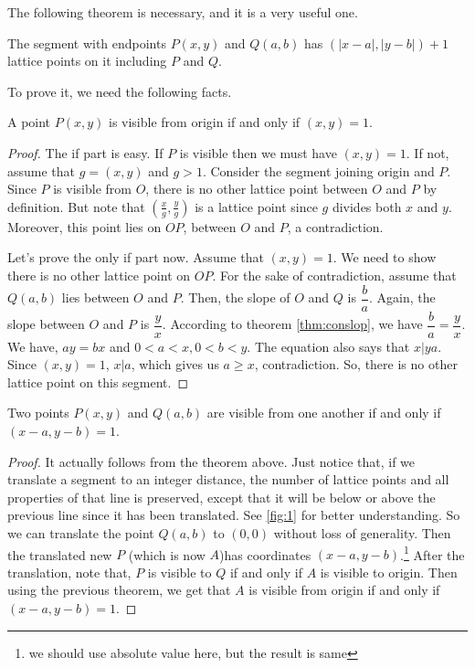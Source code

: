 \documentclass{subfile}
\begin{document}
	\begin{hint}
		The following theorem is necessary, and it is a very useful one.
			\begin{theorem}\label{thm:nolp}
				The segment with endpoints $P(x,y)$ and $Q(a,b)$ has $(|x-a|,|y-b|)+1$ lattice points on it including $P$ and $Q$.
			\end{theorem}
		To prove it, we need the following facts.	
			\begin{theorem}
				A point $P(x,y)$ is visible from origin if and only if $(x,y)=1$.
			\end{theorem}
			
			\begin{proof}
				The if part is easy. If $P$ is visible then we must have $(x,y)=1$. If not, assume that $g=(x,y)$ and $g>1$. Consider the segment joining origin and $P$. Since $P$ is visible from $O$, there is no other lattice point between $O$ and $P$ by definition. But note that $(\frac{x}{g},\frac{y}{g})$ is a lattice point since $g$ divides both $x$ and $y$. Moreover, this point lies on $OP$, between $O$ and $P$, a contradiction.
				
				Let's prove the only if part now. Assume that $(x,y)=1$. We need to show there is no other lattice point on $OP$. For the sake of contradiction, assume that $Q(a,b)$ lies between $O$ and $P$. Then, the slope of $O$ and $Q$ is $\dfrac{b}{a}$. Again, the slope between $O$ and $P$ is $\dfrac{y}{x}$. According to theorem \eqref{thm:conslop}, we have $\dfrac{b}{a}=\dfrac{y}{x}$. We have, $ay=bx$ and $0<a<x,0<b<y$. The equation also says that $x|ya$. Since $(x,y)=1$, $x|a$, which gives us $a\geq x$, contradiction. So, there is no other lattice point on this segment.
				
			\end{proof}
			
			\begin{theorem}
				Two points $P(x,y)$ and $Q(a,b)$ are visible from one another if and only if $(x-a,y-b)=1$.
			\end{theorem}
			
			\begin{proof}
				It actually follows from the theorem above. Just notice that, if we translate a segment to an integer distance, the number of lattice points and all properties of that line is preserved, except that it will be below or above the previous line since it has been translated. See \eqref{fig:1} for better understanding. So we can translate the point $Q(a,b)$ to $(0,0)$ without loss of generality. Then the translated new $P$ (which is now $A$)has coordinates $(x-a,y-b)$.\footnote{we should use absolute value here, but the result is same} After the translation, note that, $P$ is visible to $Q$ if and only if $A$ is visible to origin. Then using the previous theorem, we get that $A$ is visible from origin if and only if $(x-a,y-b)=1$.
				

\end{proof}
\end{hint}
\end{document}
